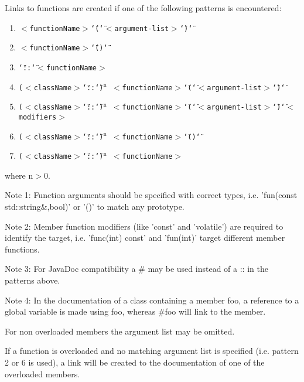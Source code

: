 Links to functions are created if one of the following patterns is encountered: \begin{enumerate}
\item {\tt $<$functionName$>$\char`\"{}(\char`\"{}$<$argument-list$>$\char`\"{})\char`\"{}} \item {\tt $<$functionName$>$\char`\"{}()\char`\"{}} \item {\tt \char`\"{}::\char`\"{}$<$functionName$>$} \item {\tt ($<$className$>$\char`\"{}::\char`\"{})$^{\mbox{n}}$ $<$functionName$>$\char`\"{}(\char`\"{}$<$argument-list$>$\char`\"{})\char`\"{}} \item {\tt ($<$className$>$\char`\"{}::\char`\"{})$^{\mbox{n}}$ $<$functionName$>$\char`\"{}(\char`\"{}$<$argument-list$>$\char`\"{})\char`\"{}$<$modifiers$>$} \item {\tt ($<$className$>$\char`\"{}::\char`\"{})$^{\mbox{n}}$ $<$functionName$>$\char`\"{}()\char`\"{}} \item {\tt ($<$className$>$\char`\"{}::\char`\"{})$^{\mbox{n}}$ $<$functionName$>$} \end{enumerate}
where n$>$0.

\begin{Desc}
\item[Note 1: ]Function arguments should be specified with correct types, i.e. 'fun(const std::string\&,bool)' or '()' to match any prototype. \end{Desc}
\begin{Desc}
\item[Note 2:]Member function modifiers (like 'const' and 'volatile') are required to identify the target, i.e. 'func(int) const' and 'fun(int)' target different member functions. \end{Desc}
\begin{Desc}
\item[Note 3: ]For JavaDoc compatibility a \# may be used instead of a :: in the patterns above. \end{Desc}
\begin{Desc}
\item[Note 4:]In the documentation of a class containing a member foo, a reference to a global variable is made using foo, whereas \#foo will link to the member.\end{Desc}
For non overloaded members the argument list may be omitted.

If a function is overloaded and no matching argument list is specified (i.e. pattern 2 or 6 is used), a link will be created to the documentation of one of the overloaded members.

